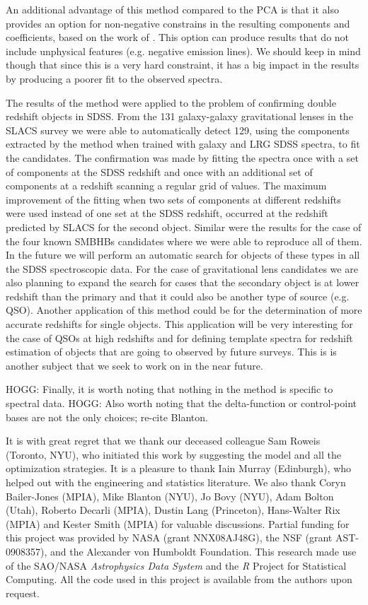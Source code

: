 \documentclass[12pt,preprint]{aastex}
\newcommand{\project}[1]{\textsl{#1}}
\begin{document}
An additional advantage of this method compared to the PCA is that it
also provides an option for non-negative constrains in the resulting
components and coefficients, based on the work of \cite{blanton}. This
option can produce results that do not include unphysical features
(e.g. negative emission lines). We should keep in mind though that
since this is a very hard constraint, it has a big impact in the
results by producing a poorer fit to the observed spectra.

The results of the method were applied to the problem of confirming
double redshift objects in SDSS. From the 131 galaxy-galaxy
gravitational lenses in the SLACS survey we were able to automatically
detect 129, using the components extracted by the method when trained
with galaxy and LRG SDSS spectra, to fit the candidates. The
confirmation was made by fitting the spectra once with a set of
components at the SDSS redshift and once with an additional set of
components at a redshift scanning a regular grid of values. The
maximum improvement of the fitting when two sets of components at
different redshifts were used instead of one set at the SDSS redshift,
occurred at the redshift predicted by SLACS for the second
object. Similar were the results for the case of the four known SMBHBs
candidates where we were able to reproduce all of them. In the future
we will perform an automatic search for objects of these types in all
the SDSS spectroscopic data. For the case of gravitational lens
candidates we are also planning to expand the search for cases that
the secondary object is at lower redshift than the primary and that it
could also be another type of source (e.g. QSO). Another application
of this method could be for the determination of more accurate
redshifts for single objects. This application will be very
interesting for the case of QSOs at high redshifts and for defining
template spectra for redshift estimation of objects that are going to
observed by future surveys. This is is another subject that we seek to
work on in the near future.

HOGG: Finally, it is worth noting that nothing in the method is
specific to spectral data.  HOGG: Also worth noting that the
delta-function or control-point bases are not the only choices;
re-cite Blanton.

\acknowledgments It is with great regret that we thank our deceased
colleague Sam Roweis (Toronto, NYU), who initiated this work by
suggesting the model and all the optimization strategies.  It is a
pleasure to thank Iain Murray (Edinburgh), who helped out with the
engineering and statistics literature.  We also thank Coryn Bailer-Jones (MPIA), 
Mike Blanton (NYU), Jo Bovy (NYU), Adam Bolton (Utah), Roberto Decarli (MPIA),
Dustin Lang (Princeton), Hans-Walter Rix (MPIA) and Kester Smith (MPIA) for valuable
discussions.  Partial funding for this project was provided by NASA
(grant NNX08AJ48G), the NSF (grant AST-0908357), and the Alexander von
Humboldt Foundation.  This research made use of the SAO/NASA
\project{Astrophysics Data System} and the \project{R} Project for
Statistical Computing.  All the code used in this project is available
from the authors upon request.
\end{document}
